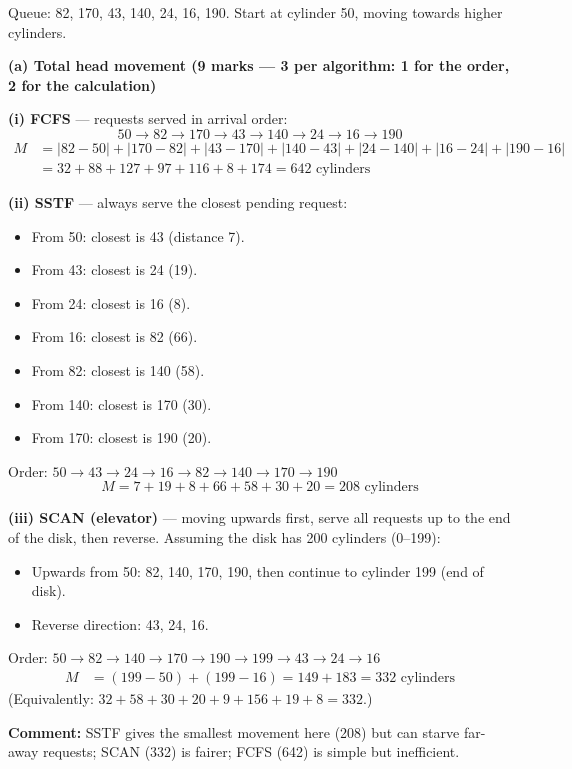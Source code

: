 \documentclass[11pt]{article}
\begin{document}
\begin{corrige}
Queue: 82, 170, 43, 140, 24, 16, 190. Start at cylinder 50, moving towards higher cylinders.

\textbf{(a) Total head movement (9 marks — 3 per algorithm: 1 for the order, 2 for the calculation)}

\textbf{(i) FCFS} — requests served in arrival order:
\[ 50 \to 82 \to 170 \to 43 \to 140 \to 24 \to 16 \to 190 \]
\begin{align*}
M &= |82-50| + |170-82| + |43-170| + |140-43| + |24-140| + |16-24| + |190-16| \\
&= 32 + 88 + 127 + 97 + 116 + 8 + 174 = \boxed{642 \text{ cylinders}}
\end{align*}

\textbf{(ii) SSTF} — always serve the closest pending request:
\begin{itemize}
\item From 50: closest is 43 (distance 7).
\item From 43: closest is 24 (19).
\item From 24: closest is 16 (8).
\item From 16: closest is 82 (66).
\item From 82: closest is 140 (58).
\item From 140: closest is 170 (30).
\item From 170: closest is 190 (20).
\end{itemize}
Order: $50 \to 43 \to 24 \to 16 \to 82 \to 140 \to 170 \to 190$
\[ M = 7 + 19 + 8 + 66 + 58 + 30 + 20 = \boxed{208 \text{ cylinders}} \]

\textbf{(iii) SCAN (elevator)} — moving upwards first, serve all requests up to the end of the disk, then reverse. Assuming the disk has 200 cylinders (0–199):
\begin{itemize}
\item Upwards from 50: 82, 140, 170, 190, then continue to cylinder 199 (end of disk).
\item Reverse direction: 43, 24, 16.
\end{itemize}
Order: $50 \to 82 \to 140 \to 170 \to 190 \to 199 \to 43 \to 24 \to 16$
\begin{align*}
M &= (199 - 50) + (199 - 16) = 149 + 183 = \boxed{332 \text{ cylinders}}
\end{align*}
(Equivalently: $32+58+30+20+9+156+19+8 = 332$.)

\textbf{Comment:} SSTF gives the smallest movement here (208) but can starve far-away requests; SCAN (332) is fairer; FCFS (642) is simple but inefficient.


\end{corrige}
\end{document}
